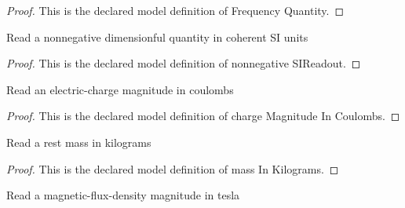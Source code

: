 \begin{proof}
  This is the declared model definition of Frequency Quantity.
\end{proof}
\begin{definition}
  \label{def:physics:phyx-mini-0956:phyxminiproblems-problemphyxmini0956-nonnegativesireadout}
  Read a nonnegative dimensionful quantity in coherent SI units
\end{definition}
\begin{proof}
  This is the declared model definition of nonnegative SIReadout.
\end{proof}
\begin{definition}
  \label{def:physics:phyx-mini-0956:phyxminiproblems-problemphyxmini0956-chargemagnitudeincoulombs}
  Read an electric-charge magnitude in coulombs
\end{definition}
\begin{proof}
  This is the declared model definition of charge Magnitude In Coulombs.
\end{proof}
\begin{definition}
  \label{def:physics:phyx-mini-0956:phyxminiproblems-problemphyxmini0956-massinkilograms}
  Read a rest mass in kilograms
\end{definition}
\begin{proof}
  This is the declared model definition of mass In Kilograms.
\end{proof}
\begin{definition}
  \label{def:physics:phyx-mini-0956:phyxminiproblems-problemphyxmini0956-magneticfluxdensityinteslas}
  Read a magnetic-flux-density magnitude in tesla
\end{definition}
